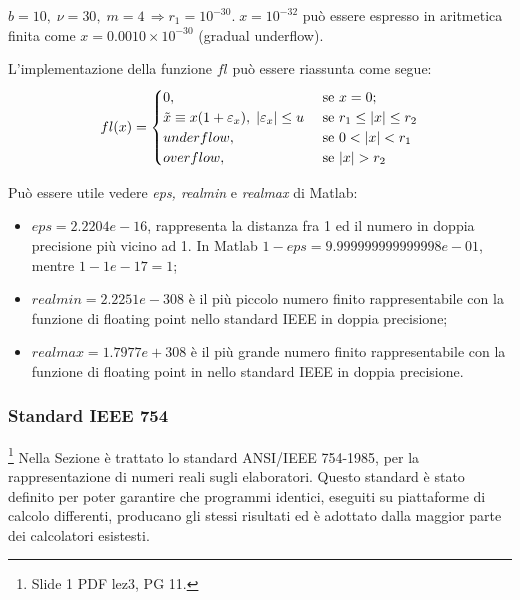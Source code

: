 \begin{example}
    $b=10,\; \nu=30,\; m=4\, \Rightarrow r_1=10^{-30}.\; x=10^{-32}$ può essere espresso in aritmetica finita come $x=0.0010\times 10^{-30}$ (gradual underflow).
\end{example}

L'implementazione della funzione $fl$ può essere riassunta come segue:
\begin{align*}
    fl(x)=\begin{cases}
        0, &\text{ se } x=0;\\
        \Tilde{x}\equiv x(1+\varepsilon_x),\; |\varepsilon_x|\leq u &\text{ se } r_1\leq|x|\leq r_2\\
        underflow, &\text{ se } 0<|x|<r_1\\
        overflow, &\text{ se } |x|>r_2
    \end{cases}
\end{align*}

\begin{remark}\label{rem:epsRMaxRmin}
    Può essere utile vedere \textit{eps, realmin} e \textit{realmax} di Matlab:
\end{remark}

\begin{itemize}
    \item $eps =  2.2204e-16$, rappresenta la distanza fra 1 ed il numero in doppia precisione più vicino ad 1. In Matlab $1 - eps = 9.999999999999998e-01$, mentre $1 - 1e-17 = 1$;
    \item $realmin = 2.2251e-308$ è il più piccolo numero finito rappresentabile con la funzione di floating point nello standard IEEE in doppia precisione;
    \item $realmax = 1.7977e+308$ è il più grande numero finito rappresentabile con la funzione di floating point in nello standard IEEE in doppia precisione.
\end{itemize}

\subsubsection{Standard IEEE 754}\footnote{Slide 1 PDF lez3, PG 11.}
Nella Sezione è trattato lo standard ANSI/IEEE 754-1985, per la rappresentazione di numeri reali sugli elaboratori. Questo standard è stato definito per poter garantire che programmi identici, eseguiti su piattaforme di calcolo differenti, producano gli stessi risultati ed è adottato dalla maggior parte dei calcolatori esistesti. 

